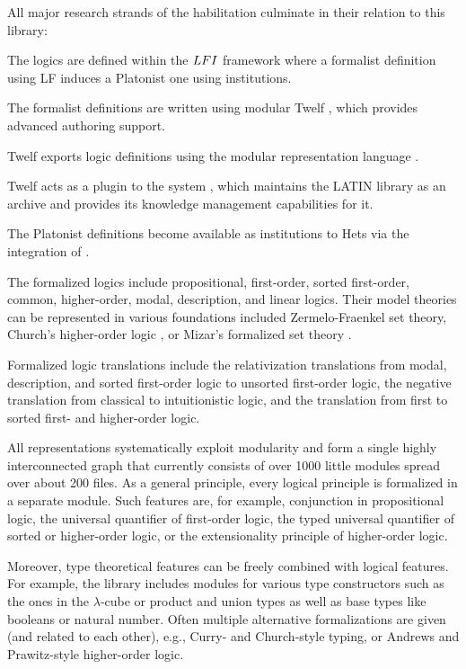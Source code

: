 All major research strands of the habilitation culminate in their relation to this library:
\begin{compactitem}
 \item The logics are defined within the $LFI$ framework  where a formalist definition using LF induces a Platonist one using institutions.
 \item The formalist definitions are written using modular Twelf , which provides advanced authoring support.
 \item Twelf exports logic definitions using the modular representation language {\mmt} .
 \item Twelf acts as a plugin to the {\mmt} system , which maintains the LATIN library as an {\mmt} archive and provides its knowledge management capabilities for it.
 \item The Platonist definitions become available as institutions to Hets via the integration of .
\end{compactitem}
\medskip

The formalized logics include propositional, first-order, sorted first-order, common, higher-order, modal, description, and linear logics.
Their model theories can be represented in various foundations included Zermelo-Fraenkel set theory, Church's higher-order logic \cite{churchtypes}, or Mizar's formalized set theory \cite{mizar}.

Formalized logic translations include the relativization translations from modal, description, and sorted first-order logic to unsorted first-order logic,
the negative translation from classical to intuitionistic logic, and the translation from first to sorted first- and higher-order logic.

All representations systematically exploit modularity and form a single highly interconnected graph that currently consists of over 1000 little modules spread over about 200 files.
As a general principle, every logical principle is formalized in a separate module.
Such features are, for example, conjunction in propositional logic, the universal quantifier of first-order logic, the typed universal quantifier of sorted or higher-order logic, or the extensionality principle of higher-order logic.

Moreover, type theoretical features can be freely combined with logical features.
For example, the library includes modules for various type constructors such as the ones in the $\lambda$-cube or product and union types as well as base types like booleans or natural number.
Often multiple alternative formalizations are given (and related to each other), e.g., Curry- and Church-style typing, or Andrews and Prawitz-style higher-order logic.
\medskip

